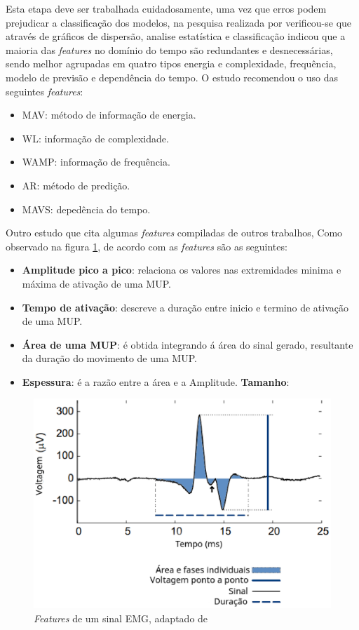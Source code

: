Esta etapa deve ser trabalhada cuidadosamente, uma vez que erros podem prejudicar a classificação dos modelos, na pesquisa realizada por  verificou-se que através de gráficos de dispersão, analise estatística e classificação indicou que a maioria das \textit{features} no domínio do tempo são redundantes e desnecessárias, sendo melhor agrupadas em quatro tipos energia e complexidade, frequência, modelo de previsão e dependência do tempo. O estudo recomendou o uso das seguintes \textit{features}:

\begin{itemize}
    \item MAV: método de informação de energia.
    \item WL: informação de complexidade.
    \item WAMP: informação de frequência.
    \item AR: método de predição.
    \item MAVS: depedência  do tempo.
\end{itemize}

Outro estudo que cita algumas \textit{features} compiladas de outros trabalhos, Como observado na figura \ref{featuresEMG}, de acordo com  as \textit{features} são as seguintes:

\begin{itemize}
    \item \textbf{Amplitude pico a pico}: relaciona os valores nas extremidades minima e máxima de ativação de uma MUP.
    \item \textbf{Tempo de ativação}: descreve a duração entre inicio e termino de ativação de uma MUP.
    \item \textbf{Área de uma MUP}: é obtida integrando á área do sinal gerado, resultante da duração do movimento de uma MUP.
    \item \textbf{Espessura}: é a razão entre a área e a Amplitude.
    \textbf{Tamanho}:
\end{itemize}

\begin{figure}[!htb]
    \centering
     \includegraphics[width=1\textwidth]{figuras/featuresEMG.eps}
     \caption{\textit{Features} de um sinal EMG, adaptado de }
     \label{featuresEMG}
 \end{figure}
 

